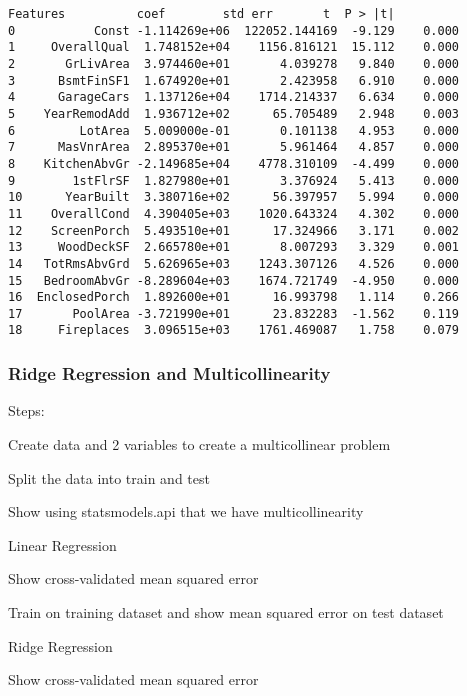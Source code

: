 \documentclass[11pt]{article}
\begin{document}
    \begin{Verbatim}[commandchars=\\\{\}]
         Features          coef        std err       t  P > |t|
0           Const -1.114269e+06  122052.144169  -9.129    0.000
1     OverallQual  1.748152e+04    1156.816121  15.112    0.000
2       GrLivArea  3.974460e+01       4.039278   9.840    0.000
3      BsmtFinSF1  1.674920e+01       2.423958   6.910    0.000
4      GarageCars  1.137126e+04    1714.214337   6.634    0.000
5    YearRemodAdd  1.936712e+02      65.705489   2.948    0.003
6         LotArea  5.009000e-01       0.101138   4.953    0.000
7      MasVnrArea  2.895370e+01       5.961464   4.857    0.000
8    KitchenAbvGr -2.149685e+04    4778.310109  -4.499    0.000
9        1stFlrSF  1.827980e+01       3.376924   5.413    0.000
10      YearBuilt  3.380716e+02      56.397957   5.994    0.000
11    OverallCond  4.390405e+03    1020.643324   4.302    0.000
12    ScreenPorch  5.493510e+01      17.324966   3.171    0.002
13     WoodDeckSF  2.665780e+01       8.007293   3.329    0.001
14   TotRmsAbvGrd  5.626965e+03    1243.307126   4.526    0.000
15   BedroomAbvGr -8.289604e+03    1674.721749  -4.950    0.000
16  EnclosedPorch  1.892600e+01      16.993798   1.114    0.266
17       PoolArea -3.721990e+01      23.832283  -1.562    0.119
18     Fireplaces  3.096515e+03    1761.469087   1.758    0.079

    \end{Verbatim}

    \hypertarget{ridge-regression-and-multicollinearity}{%
\subsubsection{Ridge Regression and
Multicollinearity}\label{ridge-regression-and-multicollinearity}}

    Steps:

Create data and 2 variables to create a multicollinear problem

Split the data into train and test

Show using statsmodels.api that we have multicollinearity

Linear Regression

Show cross-validated mean squared error

Train on training dataset and show mean squared error on test dataset

Ridge Regression

Show cross-validated mean squared error
\end{document}
